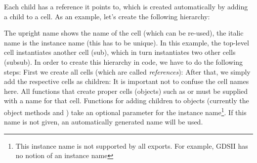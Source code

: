 Each child has a reference it points to, which is created automatically by adding a child to a cell.
As an example, let's create the following hierarchy:
\begin{center}
\end{center}
The upright name shows the name of the cell (which can be re-used), the italic name is the instance name (this has to be unique).
In this example, the top-level cell instantiates another cell (sub), which in turn instantiates two other cells (subsub).
In order to create this hierarchy in code, we have to do the following steps:
First we create all cells (which are called \emph{references}):
After that, we simply add the respective cells as children:
It is important not to confuse the cell names here.
All functions that create proper cells (objects) such as  or  must be supplied with a name for that cell.
Functions for adding children to objects (currently the object methods  and ) take an optional parameter for the instance name\footnote{This instance name is not supported by all exports.
For example, GDSII has no notion of an instance name}.
If this name is not given, an automatically generated name will be used.

